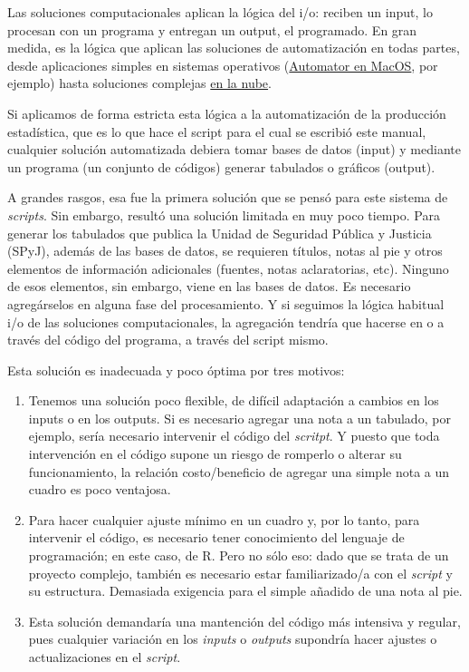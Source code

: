\documentclass[
  spanish,
]{book}
\begin{document}
Las soluciones computacionales aplican la lógica del i/o: reciben un input, lo procesan con un programa y entregan un output, el programado. En gran medida, es la lógica que aplican las soluciones de automatización en todas partes, desde aplicaciones simples en sistemas operativos (\href{https://www.applesfera.com/tutoriales/macos-automatizacion-pon-tu-mac-trabajar-ti}{Automator en MacOS}, por ejemplo) hasta soluciones complejas \href{https://www.ansible.com/}{en la nube}.

Si aplicamos de forma estricta esta lógica a la automatización de la producción estadística, que es lo que hace el script para el cual se escribió este manual, cualquier solución automatizada debiera tomar bases de datos (input) y mediante un programa (un conjunto de códigos) generar tabulados o gráficos (output).

A grandes rasgos, esa fue la primera solución que se pensó para este sistema de \emph{scripts}. Sin embargo, resultó una solución limitada en muy poco tiempo. Para generar los tabulados que publica la Unidad de Seguridad Pública y Justicia (SPyJ), además de las bases de datos, se requieren títulos, notas al pie y otros elementos de información adicionales (fuentes, notas aclaratorias, etc). Ninguno de esos elementos, sin embargo, viene en las bases de datos. Es necesario agregárselos en alguna fase del procesamiento. Y si seguimos la lógica habitual i/o de las soluciones computacionales, la agregación tendría que hacerse en o a través del código del programa, a través del script mismo.

Esta solución es inadecuada y poco óptima por tres motivos:

\begin{enumerate}
\def\labelenumi{\arabic{enumi}.}
\item
  Tenemos una solución poco flexible, de difícil adaptación a cambios en los inputs o en los outputs. Si es necesario agregar una nota a un tabulado, por ejemplo, sería necesario intervenir el código del \emph{scritpt}. Y puesto que toda intervención en el código supone un riesgo de romperlo o alterar su funcionamiento, la relación costo/beneficio de agregar una simple nota a un cuadro es poco ventajosa.
\item
  Para hacer cualquier ajuste mínimo en un cuadro y, por lo tanto, para intervenir el código, es necesario tener conocimiento del lenguaje de programación; en este caso, de R. Pero no sólo eso: dado que se trata de un proyecto complejo, también es necesario estar familiarizado/a con el \emph{script} y su estructura. Demasiada exigencia para el simple añadido de una nota al pie.
\item
  Esta solución demandaría una mantención del código más intensiva y regular, pues cualquier variación en los \emph{inputs} o \emph{outputs} supondría hacer ajustes o actualizaciones en el \emph{script}.
\end{enumerate}
\end{document}
